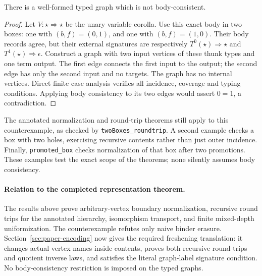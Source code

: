 \begin{proposition}
There is a well-formed typed graph which is not body-consistent.
\end{proposition}
\begin{proof}
Let $V:\star\Rightarrow\star$ be the unary variable corolla. Use this exact
body in two boxes: one with $(b,f)=(0,1)$, and one with $(b,f)=(1,0)$.
Their body records agree, but their external signatures are respectively
$T^0(\star)\Rightarrow\star$ and $T^1(\star)\Rightarrow\epsilon$.
Construct a graph with two input vertices of these thunk types and one term
output. The first edge connects the first input to the output; the second
edge has only the second input and no targets. The graph has no internal
vertices. Direct finite case analysis verifies all incidence, coverage and
typing conditions. Applying body consistency to its two edges would assert
$0=1$, a contradiction.
\end{proof}




The annotated normalization and round-trip theorems still apply to this
counterexample, as checked by \texttt{twoBoxes\_roundtrip}. A second example
checks a box with two holes, exercising recursive contents rather than just
outer incidence. Finally, \texttt{promoted\_box} checks normalization of that
box after two promotions. These examples test the exact scope of the theorems;
none silently assumes body consistency.



\paragraph{Relation to the completed representation theorem.}
The results above prove arbitrary-vertex boundary normalization, recursive
round trips for the annotated hierarchy, isomorphism transport, and finite
mixed-depth uniformization. The counterexample refutes only naive binder erasure.
Section~\ref{sec:paper-encoding} now gives the required freshening translation:
it changes actual vertex names inside contents, proves both recursive round
trips and quotient inverse laws, and satisfies the literal graph-label signature
condition. No body-consistency restriction is imposed on the typed graphs.
